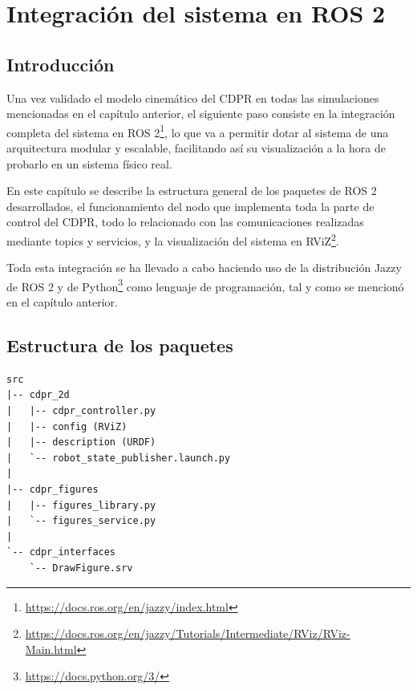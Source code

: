 \chapter{Integración del sistema en ROS 2}
\label{cap:capitulo6}

\section{Introducción}
\label{sec:segundaseccion}

Una vez validado el modelo cinemático del CDPR en todas las simulaciones mencionadas en el capítulo anterior, el siguiente paso consiste en la integración completa del sistema en ROS 2\footnote{\url{https://docs.ros.org/en/jazzy/index.html}}, lo que va a permitir dotar al sistema de una arquitectura modular y escalable, facilitando así su visualización a la hora de probarlo en un sistema físico real.

\vspace{0.25cm}

En este capítulo se describe la estructura general de los paquetes de ROS 2 desarrollados, el funcionamiento del nodo que implementa toda la parte de control del CDPR, todo lo relacionado con las comunicaciones realizadas mediante topics y servicios, y la visualización del sistema en RViZ\footnote{\url{https://docs.ros.org/en/jazzy/Tutorials/Intermediate/RViz/RViz-Main.html}}.

\vspace{0.25cm}

Toda esta integración se ha llevado a cabo haciendo uso de la distribución Jazzy de ROS 2 y de Python\footnote{\url{https://docs.python.org/3/}} como lenguaje de programación, tal y como se mencionó en el capítulo anterior.

\newpage

\section{Estructura de los paquetes}
\label{sec:segundaseccion}

\begin{code}[h]
\begin{lstlisting}
src
|-- cdpr_2d
|   |-- cdpr_controller.py
|   |-- config (RViZ)
|   |-- description (URDF)
|   `-- robot_state_publisher.launch.py
|
|-- cdpr_figures
|   |-- figures_library.py
|   `-- figures_service.py
|
`-- cdpr_interfaces
    `-- DrawFigure.srv
\end{lstlisting}
\caption[Estructura del workspace ROS 2.]{Estructura del workspace ROS 2.}
\end{code}

